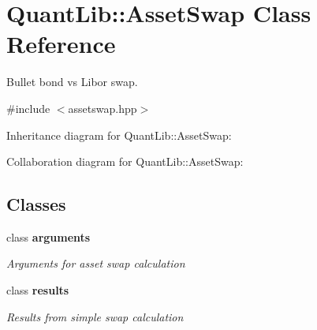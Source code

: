 \section{Quant\+Lib\+:\+:Asset\+Swap Class Reference}
\label{class_quant_lib_1_1_asset_swap}


Bullet bond vs Libor swap.  




{\ttfamily \#include $<$assetswap.\+hpp$>$}



Inheritance diagram for Quant\+Lib\+:\+:Asset\+Swap\+:


Collaboration diagram for Quant\+Lib\+:\+:Asset\+Swap\+:
\subsection*{Classes}
\begin{DoxyCompactItemize}
\item 
class {\bf arguments}
\begin{DoxyCompactList}\small\item\em Arguments for asset swap calculation \end{DoxyCompactList}\item 
class {\bf results}
\begin{DoxyCompactList}\small\item\em Results from simple swap calculation \end{DoxyCompactList}\end{DoxyCompactItemize}
